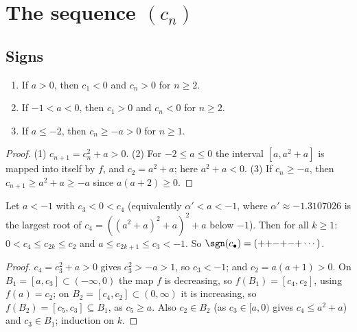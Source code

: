 \chapter{\texorpdfstring{The sequence $(c_n)$}{The sequence (c_n)}}
\label{chap:sequence}

\section{Signs}

\begin{lemma}[Signs]
  \label{lem:signs}
  \leanok
  \begin{enumerate}
    \item If $a > 0$, then $c_1 < 0$ and $c_n > 0$ for $n \ge 2$.
    \item If $-1 < a < 0$, then $c_1 > 0$ and $c_n < 0$ for $n \ge 2$.
    \item If $a \le -2$, then $c_n \ge -a > 0$ for $n \ge 1$.
  \end{enumerate}
\end{lemma}
\begin{proof}
  \leanok
  (1) $c_{n+1} = c_n^2 + a > 0$. (2) For $-2 \le a \le 0$ the interval $[a, a^2 + a]$ is mapped
  into itself by $f$, and $c_2 = a^2 + a$; here $a^2 + a < 0$. (3) If $c_n \ge -a$, then
  $c_{n+1} \ge a^2 + a \ge -a$ since $a(a + 2) \ge 0$.
\end{proof}

\begin{lemma}
  \label{lem:window}
  \leanok
  Let $a < -1$ with $c_3 < 0 < c_4$ (equivalently $\alpha' < a < -1$, where
  $\alpha' \approx -1.3107026$ is the largest root of $c_4 = ((a^2+a)^2+a)^2+a$ below $-1$). Then
  for all $k \ge 1$: $0 < c_4 \le c_{2k} \le c_2$ and $a \le c_{2k+1} \le c_3 < -1$. So
  $\sgn(c_\bullet) = ({+}{+}{-}{+}{-}{+}\cdots)$.
\end{lemma}
\begin{proof}
  \leanok
  $c_4 = c_3^2 + a > 0$ gives $c_3^2 > -a > 1$, so $c_3 < -1$; and $c_2 = a(a+1) > 0$. On
  $B_1 = [a, c_3] \subset (-\infty, 0)$ the map $f$ is decreasing, so $f(B_1) = [c_4, c_2]$, using
  $f(a) = c_2$; on $B_2 = [c_4, c_2] \subset (0, \infty)$ it is increasing, so
  $f(B_2) = [c_5, c_3] \subseteq B_1$, as $c_5 \ge a$. Also $c_2 \in B_2$ (as $c_3 \in [a, 0)$
  gives $c_4 \le a^2 + a$) and $c_3 \in B_1$; induction on $k$.
\end{proof}

